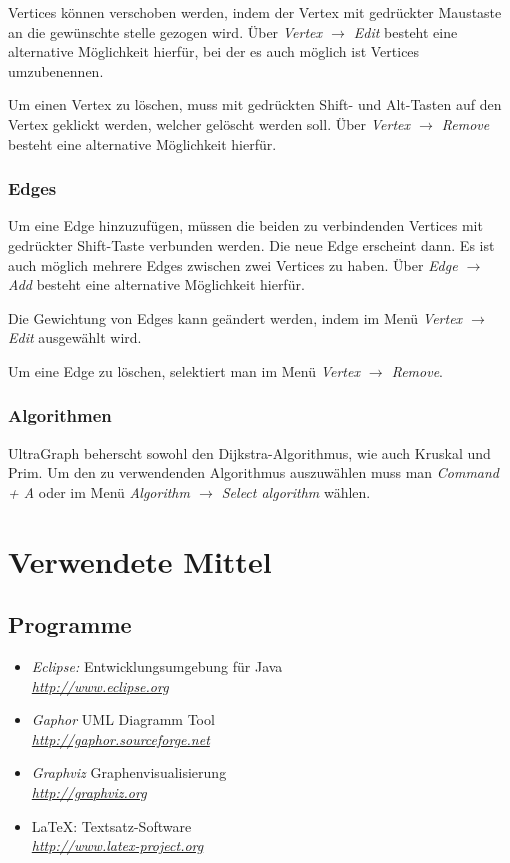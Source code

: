 \documentclass[a4paper,titlepage]{article}
\begin{document}
Vertices können verschoben werden, indem der Vertex mit gedrückter Maustaste an die gewünschte stelle gezogen wird. Über \emph{Vertex $\rightarrow$ Edit} besteht eine alternative Möglichkeit hierfür, bei der es auch möglich ist Vertices umzubenennen.

Um einen Vertex zu löschen, muss mit gedrückten Shift- und Alt-Tasten auf den Vertex geklickt werden, welcher gelöscht werden soll. Über \emph{Vertex $\rightarrow$ Remove} besteht eine alternative Möglichkeit hierfür.

\subsubsection{Edges}

Um eine Edge hinzuzufügen, müssen die beiden zu verbindenden Vertices mit gedrückter Shift-Taste verbunden werden. Die neue Edge erscheint dann. Es ist auch möglich mehrere Edges zwischen zwei Vertices zu haben. Über \emph{Edge $\rightarrow$ Add} besteht eine alternative Möglichkeit hierfür.

Die Gewichtung von Edges kann geändert werden, indem im Menü \emph{Vertex $\rightarrow$ Edit} ausgewählt wird.

Um eine Edge zu löschen, selektiert man im Menü \emph{Vertex $\rightarrow$ Remove}.

\subsubsection{Algorithmen}

UltraGraph beherscht sowohl den Dijkstra-Algorithmus, wie auch Kruskal und Prim. Um den zu verwendenden Algorithmus auszuwählen muss man \emph{Command + A} oder im Menü \emph{Algorithm $\rightarrow$ Select algorithm} wählen.

\newpage

\section{Verwendete Mittel}

\subsection{Programme}

\begin{itemize}
\item \emph{Eclipse:} Entwicklungsumgebung für Java \\
	\emph{\href{http://www.eclipse.org}{http://www.eclipse.org}}
\item \emph{Gaphor} UML Diagramm Tool \\
	\emph{\href{http://gaphor.sourceforge.net}{http://gaphor.sourceforge.net}}
\item \emph{Graphviz} Graphenvisualisierung \\
	\emph{\href{http://graphviz.org}{http://graphviz.org}}
\item \LaTeX: Textsatz-Software \\
	\emph{\href{http://www.latex-project.org}{http://www.latex-project.org}}
\end{itemize}
\end{document}
